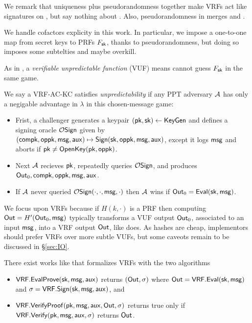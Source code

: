 We remark that uniqueness plus pseudorandomness together make VRFs 
act like signatures on \msg, but say nothing about \aux.
Also, pseudorandomness in \cite{vrf_micali} merges \Eval and \Sign.

We handle cofactors explicity in this work.  In particular, we impose
a one-to-one map from secret keys \sk to PRFs $F_\mathsf{sk}$, thanks to
 pseudorandomness, but doing so imposes some subtelties and maybe overkill.


As in \cite{agg_dkg}, a {\em verifiable unpredictable function} (VUF)
means \adv cannot guess $F_\mathsf{sk}$ in the same game.

\begin{definition}
We say a VRF-AC-KC satisfies {\em unpredictability} if 
any PPT adversary $\mathcal{A}$ has only a negigable advantage in $\lambda$
in this chosen-message game:
\begin{itemize}
 \item Frist, a challenger
  generates a keypair $(\mathsf{pk},\mathsf{sk}) \leftarrow {\ensuremath{\mathsf{KeyGen}}}$ and
  defines a signing oracle $\mathcal{O}\mathsf{Sign}$ given by
  $(\mathsf{compk},\mathsf{oppk},\mathsf{msg},\mathsf{aux}) \mapsto {\ensuremath{\mathsf{Sign}}}(\mathsf{sk},\mathsf{oppk},\mathsf{msg},\mathsf{aux})$,
   except it logs $\mathsf{msg}$ and aborts if $\mathsf{pk} \ne {\ensuremath{\mathsf{OpenKey}}}(\mathsf{pk},\mathsf{oppk})$.
 \item Next $\mathcal{A}$ recieves $\mathsf{pk}$, repeatedly queries $\mathcal{O}\mathsf{Sign}$,
  and produces ${\mathsf{Out}}_0,\mathsf{compk},\mathsf{oppk},\mathsf{msg},\mathsf{aux}$. 
 \item If $\mathcal{A}$ never queried $\mathcal{O}\mathsf{Sign}(\cdot,\cdot,\mathsf{msg},\cdot)$ then
  $\mathcal{A}$ wins if ${\mathsf{Out}}_0 = {\mathsf{Eval}}(\mathsf{sk},\mathsf{msg})$.
\end{itemize}
\end{definition}

We focus upon VRFs because
if $H(k,\cdot)$ is a PRF then computing ${\mathsf{Out}} = H'({\mathsf{Out}}_0, \mathsf{msg})$
typically transforms a VUF output ${\mathsf{Out}}_0$, associated to an input $\mathsf{msg}$,
into a VRF output ${\mathsf{Out}}$, like \cite[Proposition 1]{vrf_micali} does.
As hashes are cheap, implementors should prefer VRFs over more subtle VUFs,
 but some caveots remain to be discussed in \S\ref{sec:IO}.


There exist works like \cite[\S3.2 $\fvrf$]{praos} that formalizes VRFs with the two algorithms
\begin{itemize}
\item ${\mathsf{VRF}}.{\mathsf{EvalProve}}(\mathsf{sk},\mathsf{msg},\mathsf{aux})$ returns $({\mathsf{Out}},\sigma)$ where ${\mathsf{Out}} = {\mathsf{VRF}}.{\mathsf{Eval}}(\mathsf{sk},\mathsf{msg})$ and $\sigma = {\mathsf{VRF}}.{\mathsf{Sign}}(\mathsf{sk},\mathsf{msg},\mathsf{aux})$, and
\item ${\mathsf{VRF}}.{\mathsf{VerifyProof}}(\mathsf{pk},\mathsf{msg},\mathsf{aux},{\mathsf{Out}},\sigma)$ returns true only if ${\mathsf{VRF}}.{\mathsf{Verify}}(\mathsf{pk},\mathsf{msg},\mathsf{aux},\sigma)$ returns ${\mathsf{Out}}$.
\end{itemize}

